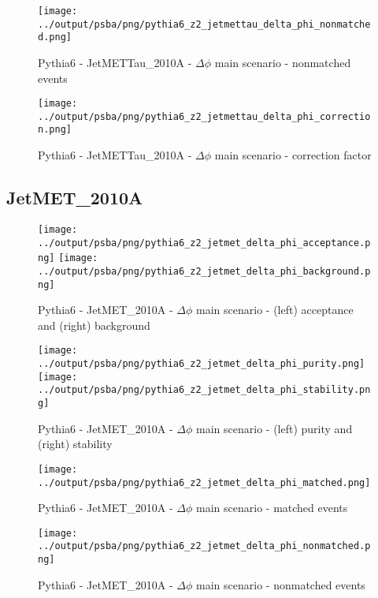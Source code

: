 \documentclass[11pt]{book}
\begin{document}
\begin{figure}[ht]
\centering
\texttt{[image: ../output/psba/png/pythia6\_z2\_jetmettau\_delta\_phi\_nonmatched.png]}
\caption{Pythia6 - JetMETTau\_2010A - $\Delta\phi$ main scenario - nonmatched events}
\label{fig:p6_jetmettau_delta_phi_nonmatched}
\end{figure}

\begin{figure}[ht]
\centering
\texttt{[image: ../output/psba/png/pythia6\_z2\_jetmettau\_delta\_phi\_correction.png]}
\caption{Pythia6 - JetMETTau\_2010A - $\Delta\phi$ main scenario - correction factor}
\label{fig:p6_jetmettau_delta_phi_correction}
\end{figure}

\clearpage
\subsection{JetMET\_2010A}

\begin{figure}[ht]
\centering
\texttt{[image: ../output/psba/png/pythia6\_z2\_jetmet\_delta\_phi\_acceptance.png]}
\texttt{[image: ../output/psba/png/pythia6\_z2\_jetmet\_delta\_phi\_background.png]}
\caption{Pythia6 - JetMET\_2010A - $\Delta\phi$ main scenario - (left) acceptance and (right) background}
\label{fig:p6_jetmet_delta_phi_ab}
\end{figure}

\begin{figure}[ht]
\centering
\texttt{[image: ../output/psba/png/pythia6\_z2\_jetmet\_delta\_phi\_purity.png]}
\texttt{[image: ../output/psba/png/pythia6\_z2\_jetmet\_delta\_phi\_stability.png]}
\caption{Pythia6 - JetMET\_2010A - $\Delta\phi$ main scenario - (left) purity and (right) stability}
\label{fig:p6_jetmet_delta_phi_ps}
\end{figure}

\begin{figure}[ht]
\centering
\texttt{[image: ../output/psba/png/pythia6\_z2\_jetmet\_delta\_phi\_matched.png]}
\caption{Pythia6 - JetMET\_2010A - $\Delta\phi$ main scenario - matched events}
\label{fig:p6_jetmet_delta_phi_matched}
\end{figure}

\begin{figure}[ht]
\centering
\texttt{[image: ../output/psba/png/pythia6\_z2\_jetmet\_delta\_phi\_nonmatched.png]}
\caption{Pythia6 - JetMET\_2010A - $\Delta\phi$ main scenario - nonmatched events}
\label{fig:p6_jetmet_delta_phi_nonmatched}
\end{figure}
\end{document}
